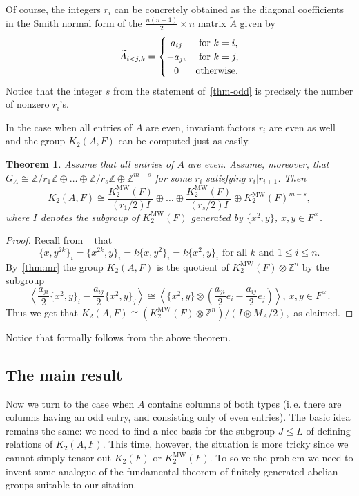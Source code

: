 \documentclass[oneside, 10pt]{amsart}
\theoremstyle{plain}
\newtheorem{thm}{Theorem}
\theoremstyle{remark}
\theoremstyle{definition}
\newcommand{\ZZ}{\mathbb{Z}}
\newcommand{\K}{K_2}
\newcommand{\Kmw}{K^{\mathrm{MW}}_2}
\begin{document}
Of course, the integers $r_i$ can be concretely obtained as
  the diagonal coefficients in the Smith normal form of the $\frac{n(n-1)}{2}\times n$ matrix $\widetilde{A}$ given by
\begin{equation} \label{eq:Aijk} \widetilde{A}_{i<j, k} = \left\{\def\arraystretch{1.2}%
  \begin{array}{@{}c@{\quad}l@{}}
     a_{ij} & \text{ for } k = i, \\
    -a_{ji} & \text{ for } k = j, \\
    0 & \text{otherwise.}    
  \end{array}\right.\end{equation}                    
Notice that the integer $s$ from the statement of~\cref{thm-odd} is precisely the number of nonzero $r_i$'s.
  
In the case when all entries of $A$ are even, invariant factors $r_i$ are even as well and the group $\K(A, F)$ can be computed just as easily.
\begin{thm} \label{thm-even}
  Assume that all entries of $A$ are even.
  Assume, moreover, that $G_A \cong \ZZ / r_1 \ZZ \oplus \ldots \oplus \ZZ / r_s\ZZ \oplus \ZZ^{m-s}$ for some $r_i$ satisfying $r_i | r_{i+1}$.
  Then
   \[\K(A, F) \cong \frac{\Kmw(F)}{(r_1/2) I} \oplus \ldots \oplus \frac{\Kmw(F)}{(r_s/2) I} \oplus \Kmw(F)^{m-s}, \]
    where $I$ denotes the subgroup of $\Kmw(F)$ generated by $\{x^2, y\}$, $x, y\in F^\times$.
\end{thm}
\begin{proof}
 Recall from ~\cite[Lemma~3.2]{MW} that
 \[\{x, y^{2k}\}_i = \{x^{2k}, y\}_i = k\{x,y^2\}_i = k\{x^2, y\}_i \text{ for all } k\text{ and } 1\leq i\leq n.\]
 By~\cref{thm:mr} the group $\K(A, F)$ is the quotient of
  $\Kmw(F) \otimes \ZZ^n$ by the subgroup 
  \[\left\langle \frac{a_{ji}}{2}\{x^2, y\}_i - \frac{a_{ij}}{2}\{x^2, y\}_j \right\rangle \cong \left\langle 
   \{x^2, y\} \otimes \left(\frac{a_{ji}}{2} e_i - \frac{a_{ij}}{2} e_j\right)\right\rangle,\ x,y\in F^\times. \]
 Thus we get that $\K(A, F) \cong \left(\Kmw(F) \otimes \ZZ^n\right) / (I \otimes M_A/2),$ as claimed. 
\end{proof}
Notice that \cite[Theorem~6.1]{MW} formally follows from the above theorem.

\subsection{The main result}
Now we turn to the case when $A$ contains columns of both types 
(i.\,e. there are columns having an odd entry, and consisting only of even entries).
The basic idea remains the same: we need to find a nice basis for the subgroup $J\leq L$ of defining relations of $\K(A, F)$.
This time, however, the situation is more tricky since we cannot simply tensor out $\K(F)$ or $\Kmw(F)$.
To solve the problem we need to invent some analogue of the fundamental theorem of finitely-generated abelian groups suitable to our sitation.
\end{document}

